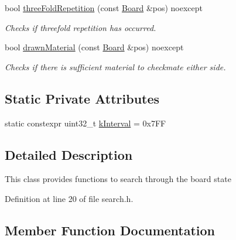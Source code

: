 \begin{DoxyCompactItemize}
\begin{DoxyCompactList}
 \end{DoxyCompactList}\item 
bool \mbox{\hyperlink{classSearchAgent_acaf7ae2df02a071a23e6db4fbbdc7d99}{three\+Fold\+Repetition}} (const \mbox{\hyperlink{classBoard}{Board}} \&pos) noexcept
\begin{DoxyCompactList}\small\item\em Checks if threefold repetition has occurred. \end{DoxyCompactList}\item 
bool \mbox{\hyperlink{classSearchAgent_a93b96a89b905ff786e520b23481ed0d7}{drawn\+Material}} (const \mbox{\hyperlink{classBoard}{Board}} \&pos) noexcept
\begin{DoxyCompactList}\small\item\em Checks if there is sufficient material to checkmate either side. \end{DoxyCompactList}\end{DoxyCompactItemize}
\subsection*{Static Private Attributes}
\begin{DoxyCompactItemize}
\item 
static constexpr uint32\+\_\+t \mbox{\hyperlink{classSearchAgent_ac040d91cab3fb103bce31d669d2bba47}{k\+Interval}} = 0x7\+FF
\end{DoxyCompactItemize}


\subsection{Detailed Description}
This class provides functions to search through the board state 

Definition at line 20 of file search.\+h.



\subsection{Member Function Documentation}
\mbox{\label{classSearchAgent_a276e7dc17f276cf7d1c5fe91218f55c2}} 
